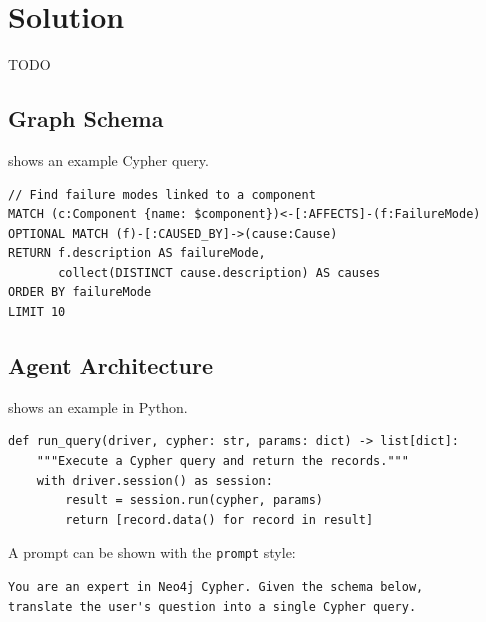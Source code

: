 \chapter{Solution}\label{ch:solution}

TODO

\section{Graph Schema}\label{sec:solution_schema}

 shows an example Cypher query.

\begin{lstlisting}[language=Cypher,
                   caption={Example Cypher query (placeholder).},
                   label={lst:cypher-example}]
// Find failure modes linked to a component
MATCH (c:Component {name: $component})<-[:AFFECTS]-(f:FailureMode)
OPTIONAL MATCH (f)-[:CAUSED_BY]->(cause:Cause)
RETURN f.description AS failureMode,
       collect(DISTINCT cause.description) AS causes
ORDER BY failureMode
LIMIT 10
\end{lstlisting}

\section{Agent Architecture}\label{sec:solution_agent}

 shows an example in Python.

\begin{lstlisting}[style=python,
                   caption={Example Python code (placeholder).},
                   label={lst:python-example}]
def run_query(driver, cypher: str, params: dict) -> list[dict]:
    """Execute a Cypher query and return the records."""
    with driver.session() as session:
        result = session.run(cypher, params)
        return [record.data() for record in result]
\end{lstlisting}

A prompt can be shown with the \texttt{prompt} style:

\begin{lstlisting}[style=prompt,
                   caption={Example prompt (placeholder).},
                   label={lst:prompt-example}]
You are an expert in Neo4j Cypher. Given the schema below,
translate the user's question into a single Cypher query.
\end{lstlisting}
